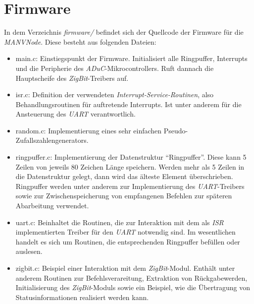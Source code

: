     \section{Firmware}

    In dem Verzeichnis \emph{firmware/} befindet sich der Quellcode der Firmware für die \emph{MANVNode}.
    Diese besteht aus folgenden Dateien:

    \begin{itemize}
        \item{main.c:} Einstiegspunkt der Firmware. Initialisiert alle Ringpuffer, Interrupts und 
                       die Peripherie des \emph{ADuC}-Mikrocontrollers. Ruft dannach die 
                       Hauptscheife des \emph{ZigBit}-Treibers auf.
        \item{isr.c:}  Definition der verwendeten \emph{Interrupt-Service-Routinen}, also Behandlungsroutinen
                       für auftretende Interrupts. Ist unter anderem für die Ansteuerung des \emph{UART} 
                       verantwortlich.
        \item{random.c:} Implementierung eines sehr einfachen Pseudo-Zufallszahlengenerators.
        \item{ringpuffer.c}: Implementierung der Datenstruktur "`Ringpuffer"'. Diese kann 5 Zeilen
                             von jeweils 80 Zeichen Länge speichern. Werden mehr als 5 Zeilen in die
                             Datenstruktur gelegt, dann wird das älteste Element überschrieben.
                             Ringpuffer werden unter anderem zur Implementierung des \emph{UART}-Treibers
                             sowie zur Zwischenspeicherung von empfangenen Befehlen zur späteren
                             Abarbeitung verwendet.
        \item{uart.c:} Beinhaltet die Routinen, die zur Interaktion mit dem als \emph{ISR} implementierten
                       Treiber für den \emph{UART} notwendig sind. Im wesentlichen handelt es sich um 
                       Routinen, die entsprechenden Ringpuffer befüllen oder auslesen.
        \item{zigbit.c:} Beispiel einer Interaktion mit dem \emph{ZigBit}-Modul. Enthält unter anderem Routinen
                         zur Befehlsverareitung, Extraktion von Rückgabewerden, Initialisierung des \emph{ZigBit}-Moduls
                         sowie ein Beispiel, wie die Übertragung von Statusinformationen realisiert werden kann.
    \end{itemize}

